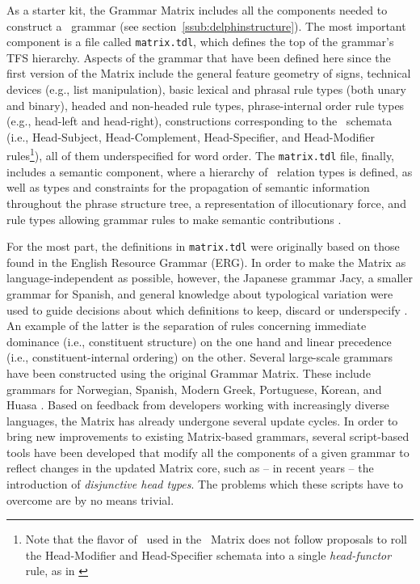 As a starter kit, the Grammar Matrix includes all the components needed to
construct a \delphin\ grammar (see section~\ref{ssub:delphinstructure}). The
most important component is a file called \texttt{matrix.tdl}, which defines
the top of the grammar's TFS hierarchy. Aspects of the grammar that have been
defined here since the first version of the Matrix \citep{Ben:Fli:Oep:02}
include the general feature geometry of signs, technical devices (e.g., list
manipulation), basic lexical and phrasal rule types (both unary and binary),
headed and non-headed rule types, phrase-internal order rule types (e.g.,
head-left and head-right), constructions corresponding to the \hpsg\ schemata
(i.e., Head-Subject, Head-Complement, Head-Specifier, and Head-Modifier
rules\footnote{Note that the flavor of \hpsg\ used in the \lingo\ Matrix does
not follow proposals to roll the Head-Modifier and Head-Specifier schemata into
a single \emph{head-functor} rule, as in \citet{vaneynde1998immediate} }), all
of them underspecified for word order. The \texttt{matrix.tdl} file, finally,
includes a semantic component, where a hierarchy of \mrs\ relation types is
defined, as well as types and constraints for the propagation of semantic
information throughout the phrase structure tree, a representation of
illocutionary force, and rule types allowing grammar rules to make semantic
contributions \citep{Flickinger:Ben:03}.

For the most part, the definitions in \texttt{matrix.tdl} were originally based
on those found in the English Resource Grammar (ERG). In order to make the
Matrix as language-independent as possible, however, the Japanese grammar Jacy,
a smaller grammar for Spanish, and general knowledge about typological
variation were used to guide decisions about which definitions to keep, discard
or underspecify \citep{Ben:Fli:Oep:02,fokkens2011metagrammar}. An example of
the latter is the separation of rules concerning immediate dominance (i.e.,
constituent structure) on the one hand and linear precedence (i.e.,
constituent-internal ordering) on the other. Several large-scale grammars have
been constructed using the original Grammar Matrix. These include grammars for
Norwegian, Spanish, Modern Greek, Portuguese, Korean, and Huasa
\citep{fokkens2014enhancing}. Based on feedback from developers working with
increasingly diverse languages, the Matrix has already undergone several update
cycles. In order to bring new improvements to existing Matrix-based grammars,
several script-based tools have been developed that modify all the components
of a given grammar to reflect changes in the updated Matrix core, such as -- in
recent years -- the introduction of \emph{disjunctive head types}. The problems
which these scripts have to overcome are by no means trivial.


